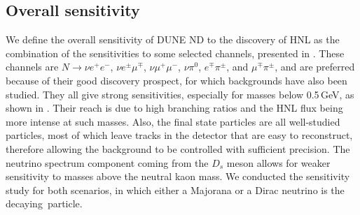 \subsection{Overall sensitivity}

We define the overall sensitivity of DUNE ND to the discovery of HNL as the combination of the sensitivities %
to some selected channels, presented in .
These channels are $N \to \nu e^+ e^-$, $\nu e^\pm \mu^\mp$, $\nu \mu^+\mu^-$, $\nu\pi^0$, $e^\mp\pi^\pm$, and $\mu^\mp\pi^\pm$, %
and are preferred because of their good discovery prospect, for which backgrounds have also been studied.
They all give strong sensitivities, especially for masses below 0.5\,GeV, as shown in .
Their reach is due to high branching ratios and the HNL flux being more intense at such masses.
Also, the final state particles are all well-studied particles, most of which leave tracks in the detector %
that are easy to reconstruct, therefore allowing the background to be controlled with sufficient precision.
The neutrino spectrum component coming from the $D_s$ meson allows for weaker sensitivity %
to masses above the neutral kaon mass.
We conducted the sensitivity study for both scenarios, in which either a Majorana or a Dirac neutrino is the decaying~particle.

